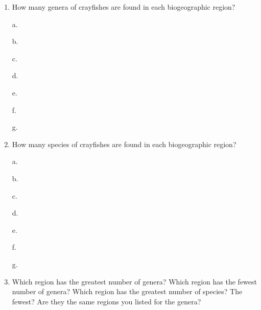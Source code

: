 \documentclass[11pt]{article}
\begin{document}
\begin{enumerate}[resume, leftmargin=*]
\item How many genera of crayfishes are found in each biogeographic region?

\begin{multicols}{2}
a.\vspace{0.5\baselineskip}

b.\vspace{0.5\baselineskip}

c.\vspace{0.5\baselineskip}

d.\vspace{0.5\baselineskip}

e.\vspace{0.5\baselineskip}

f.\vspace{0.5\baselineskip}

g.\vspace{0.5\baselineskip}
\end{multicols}

\item  How many species of crayfishes are found in each biogeographic
region?


\begin{multicols}{2}
a.\vspace{0.5\baselineskip}

b.\vspace{0.5\baselineskip}

c.\vspace{0.5\baselineskip}

d.\vspace{0.5\baselineskip}

e.\vspace{0.5\baselineskip}

f.\vspace{0.5\baselineskip}

g.\vspace{0.5\baselineskip}
\end{multicols}

\item Which region has the greatest number of genera? Which region has the
fewest number of genera? Which region has the greatest number of
species? The fewest? Are they the same regions you listed for the
genera?

\begin{multicols}{2}



\end{multicols}
\end{enumerate}
\end{document}
